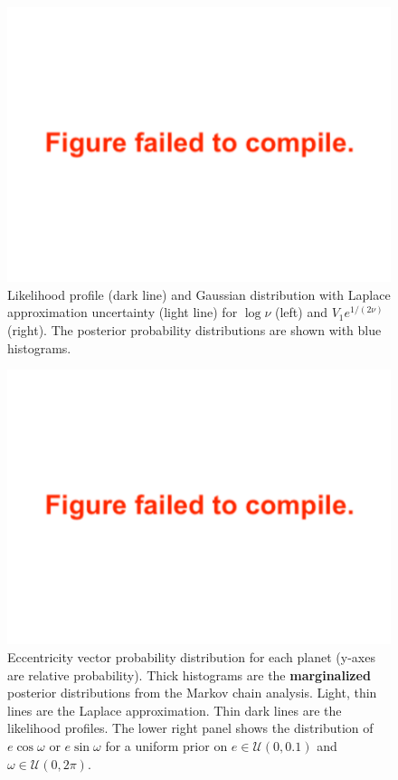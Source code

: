 \documentclass[twocolumn]{aastex63}
\begin{document}
\begin{figure}
    \centering
    \includegraphics[width=\columnwidth]{figures/T1_students_params_transformed.pdf}
    {Likelihood profile (dark line) and Gaussian distribution
        with Laplace approximation uncertainty (light line) for $\log{\nu}$ (left) and
        $V_1 e^{1/(2\nu)}$ (right).  The posterior probability distributions are shown with blue histograms.}
    \label{fig:student_param_likelihood_profile}
\end{figure}

\begin{figure}
    \centering
    \includegraphics[width=\hsize]{figures/T1_eccentricity_vectors_likelihood_profile_hmc.pdf}
    {Eccentricity vector probability distribution for each planet (y-axes are relative probability).  Thick histograms are the \textbf{marginalized} posterior distributions from the Markov chain analysis.  Light, thin lines are the Laplace approximation.  Thin dark lines are the likelihood profiles.  The lower right panel shows the distribution of
        $e\cos{\omega}$ or $e\sin{\omega}$ for a uniform prior on
        $e \in \mathcal{U}(0,0.1)$ and $\omega \in \mathcal{U}(0,2\pi)$.}
    \label{fig:ecc_likelihood_profile}
\end{figure}
\end{document}
